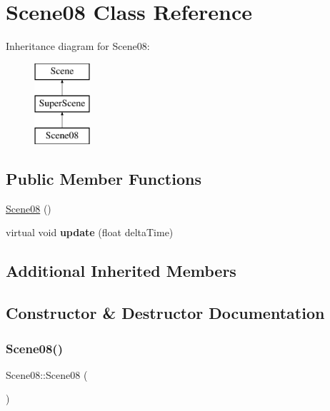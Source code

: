 \hypertarget{class_scene08}{}\section{Scene08 Class Reference}
\label{class_scene08}
Inheritance diagram for Scene08\+:\begin{figure}[H]
\begin{center}
\leavevmode
\includegraphics[height=3.000000cm]{class_scene08}
\end{center}
\end{figure}
\subsection*{Public Member Functions}
\begin{DoxyCompactItemize}
\item 
\hyperlink{class_scene08_aea86e2d7badbb0ddac6071ebeff068b1}{Scene08} ()
\item 
\mbox{\label{class_scene08_ae20f71998a0e2d8ecbe4617d6fcf56ce}} 
virtual void {\bfseries update} (float delta\+Time)
\end{DoxyCompactItemize}
\subsection*{Additional Inherited Members}


\subsection{Constructor \& Destructor Documentation}
\mbox{\label{class_scene08_aea86e2d7badbb0ddac6071ebeff068b1}} 
\subsubsection{\texorpdfstring{Scene08()}{Scene08()}}
{\footnotesize\ttfamily Scene08\+::\+Scene08 (\begin{DoxyParamCaption}{ }\end{DoxyParamCaption})}

